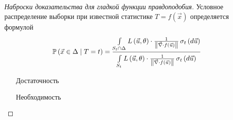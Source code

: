 \begin{proof}[Наброски доказательства для гладкой функции правдоподобия]
    Условное распределение выборки при известной статистике
    $T=f\left( \vec{x} \right)$ определяется формулой
    $$\probability{\vec{x} \in \Delta \mcond T = t}
        = \frac{\integrall{S_t \cap \Delta}{\sigma_{t}\left(d\vec{u} \right)}{
            L\left( \vec{u}, \theta \right) \cdot \frac{1}{
                \left\| \vec{\nabla} \cdot f\left( \vec{u} \right) \right\|}}}
            {\integrall{S_t}{\sigma_{t}\left(d\vec{u} \right)}{
                L\left( \vec{u}, \theta \right) \cdot \frac{1}{
                    \left\| \vec{\nabla}
                        \cdot f\left( \vec{u} \right) \right\|}}}$$
    \begin{enumerate}
        \item[Достаточность]
        \item[Необходимость]
    \end{enumerate}
\end{proof}
